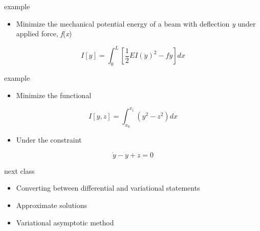 \documentclass[
  letterpaper,
  ignorenonframetext,
  aspectratio=43,
  handout,
  12pt]{beamer}
\providecommand{\tightlist}{%
  \setlength{\itemsep}{0pt}\setlength{\parskip}{0pt}}
\providecommand{\tightlist}{%
\setlength{\itemsep}{0pt}\setlength{\parskip}{0pt}}
\begin{document}
\begin{frame}{example}
\protect\hypertarget{example-2}{}
\begin{itemize}
\tightlist
\item
  Minimize the mechanical potential energy of a beam with deflection
  \emph{y} under applied force, \emph{f}(\emph{x})
\end{itemize}

\[I[y] = \int_0^L \left[ \frac{1}{2} EI (\ddot{y})^2 - fy\right] dx\]
\end{frame}

\begin{frame}{example}
\protect\hypertarget{example-3}{}
\begin{itemize}
\tightlist
\item
  Minimize the functional
\end{itemize}

\[I[y,z] = \int_{x_0}^{x_1} (y^2 - z^2) dx \]

\begin{itemize}
\tightlist
\item
  Under the constraint
\end{itemize}

\[\dot{y} - y + z = 0\]
\end{frame}

\begin{frame}{next class}
\protect\hypertarget{next-class}{}
\begin{itemize}
\tightlist
\item
  Converting between differential and variational statements
\item
  Approximate solutions
\item
  Variational asymptotic method
\end{itemize}
\end{frame}
\end{document}
